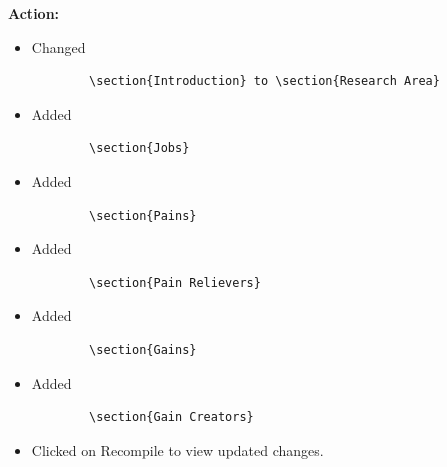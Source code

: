 \documentclass{article}
\begin{document}
\textbf{Action:}
\begin{itemize}
    \item Changed \begin{verbatim}
        \section{Introduction} to \section{Research Area}
    \end{verbatim}
    \item Added \begin{verbatim}
        \section{Jobs}
    \end{verbatim}
    \item Added \begin{verbatim}
        \section{Pains}
    \end{verbatim}
    \item Added \begin{verbatim}
        \section{Pain Relievers}
    \end{verbatim}
    \item Added \begin{verbatim}
        \section{Gains}
    \end{verbatim}
    \item Added \begin{verbatim}
        \section{Gain Creators}
    \end{verbatim}
    \item Clicked on Recompile to view updated changes.
\end{itemize}
\end{document}
